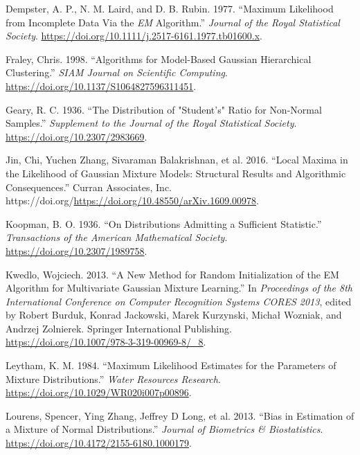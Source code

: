 \begin{CSLReferences}{1}{0}
\leavevmode{}%
Dempster, A. P., N. M. Laird, and D. B. Rubin. 1977. {``Maximum {Likelihood} from {Incomplete Data Via} the {\emph{EM}} {Algorithm}.''} \emph{Journal of the Royal Statistical Society}. \url{https://doi.org/10.1111/j.2517-6161.1977.tb01600.x}.

\leavevmode{}%
Fraley, Chris. 1998. {``Algorithms for {Model-Based Gaussian Hierarchical Clustering}.''} \emph{SIAM Journal on Scientific Computing}. \url{https://doi.org/10.1137/S1064827596311451}.

\leavevmode{}%
Geary, R. C. 1936. {``The {Distribution} of "{Student}'s" {Ratio} for {Non-Normal Samples}.''} \emph{Supplement to the Journal of the Royal Statistical Society}. \url{https://doi.org/10.2307/2983669}.

\leavevmode{}%
Jin, Chi, Yuchen Zhang, Sivaraman Balakrishnan, et al. 2016. {``Local {Maxima} in the {Likelihood} of {Gaussian Mixture Models}: {Structural Results} and {Algorithmic Consequences}.''} Curran Associates, Inc. https://doi.org/\url{https://doi.org/10.48550/arXiv.1609.00978}.

\leavevmode{}%
Koopman, B. O. 1936. {``On {Distributions Admitting} a {Sufficient Statistic}.''} \emph{Transactions of the American Mathematical Society}. \url{https://doi.org/10.2307/1989758}.

\leavevmode{}%
Kwedlo, Wojciech. 2013. {``A {New Method} for {Random Initialization} of the {EM Algorithm} for {Multivariate Gaussian Mixture Learning}.''} In \emph{Proceedings of the {8th International Conference} on {Computer Recognition Systems CORES 2013}}, edited by Robert Burduk, Konrad Jackowski, Marek Kurzynski, Michał Wozniak, and Andrzej Zolnierek. Springer International Publishing. \url{https://doi.org/10.1007/978-3-319-00969-8/_8}.

\leavevmode{}%
Leytham, K. M. 1984. {``Maximum {Likelihood Estimates} for the {Parameters} of {Mixture Distributions}.''} \emph{Water Resources Research}. \url{https://doi.org/10.1029/WR020i007p00896}.

\leavevmode{}%
Lourens, Spencer, Ying Zhang, Jeffrey D Long, et al. 2013. {``Bias in {Estimation} of a {Mixture} of {Normal Distributions}.''} \emph{Journal of Biometrics \& Biostatistics}. \url{https://doi.org/10.4172/2155-6180.1000179}.


\end{CSLReferences}

